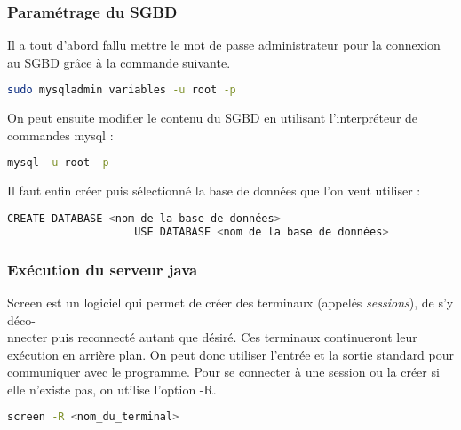 		\subsubsection{Paramétrage du SGBD}
			Il a tout d'abord fallu mettre le mot de passe administrateur pour la connexion au SGBD grâce à la commande suivante.
			\begin{mdframed}[backgroundcolor=light-gray, roundcorner=20pt,
				leftmargin=0, rightmargin=0, 
				innerleftmargin=20, linecolor=darkgray]
				\begin{lstlisting}[language=bash]
					sudo mysqladmin variables -u root -p
				\end{lstlisting}
			\end{mdframed}
			On peut ensuite modifier le contenu du SGBD en utilisant l'interpréteur de commandes mysql :
			\par
			\begin{mdframed}[backgroundcolor=light-gray, roundcorner=20pt,
				leftmargin=0, rightmargin=0, 
				innerleftmargin=20, linecolor=darkgray]
				\begin{lstlisting}[language=bash]
					mysql -u root -p
				\end{lstlisting}
			\end{mdframed}
			Il faut enfin créer puis sélectionné la base de données que l'on veut utiliser :
			\begin{mdframed}[backgroundcolor=light-gray, roundcorner=20pt,
				leftmargin=0, rightmargin=0, 
				innerleftmargin=20, linecolor=darkgray]
				\begin{lstlisting}[language=bash]
					CREATE DATABASE <nom de la base de données>
					USE DATABASE <nom de la base de données>
				\end{lstlisting}
			\end{mdframed}
		\subsubsection{Exécution du serveur java}
			Screen est un logiciel qui permet de créer des terminaux (appelés \emph{sessions}), de s'y déco-\\nnecter puis reconnecté autant que désiré.
			Ces terminaux continueront leur exécution en arrière plan. On peut donc utiliser l'entrée et la sortie standard pour communiquer avec le programme.
			Pour se connecter à une session ou la créer si elle n'existe pas, on utilise l'option -R.
			\begin{mdframed}[backgroundcolor=light-gray, roundcorner=20pt,
				leftmargin=0, rightmargin=0, 
				innerleftmargin=20, linecolor=darkgray]
				\begin{lstlisting}[language=bash]
					screen -R <nom_du_terminal>
				\end{lstlisting}
			\end{mdframed}
